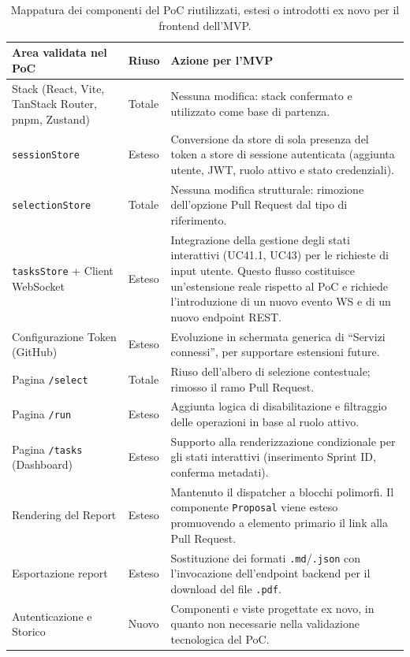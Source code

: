 \documentclass[11pt,a4paper]{article}
\begin{document}
\begin{table}[H]
\centering
\caption{Mappatura dei componenti del PoC riutilizzati, estesi o introdotti ex novo per il frontend dell'MVP.}
\label{tab:fe-mappatura-componenti}
\vspace{2mm}
\renewcommand{\arraystretch}{1.2}
\begin{tabularx}{\textwidth}{|X|l|X|}
\hline
\textbf{Area validata nel PoC} & \textbf{Riuso} & \textbf{Azione per l'MVP} \\ \hline
Stack (React, Vite, TanStack Router, pnpm, Zustand) & Totale & Nessuna modifica: stack confermato e utilizzato come base di partenza. \\ \hline
\texttt{sessionStore} & Esteso & Conversione da store di sola presenza del token a store di sessione autenticata (aggiunta utente, JWT, ruolo attivo e stato credenziali). \\ \hline
\texttt{selectionStore} & Totale & Nessuna modifica strutturale: rimozione dell'opzione Pull Request dal tipo di riferimento. \\ \hline
\texttt{tasksStore} + Client WebSocket & Esteso & Integrazione della gestione degli stati interattivi (UC41.1, UC43) per le richieste di input utente. Questo flusso costituisce un'estensione reale rispetto al PoC e richiede l'introduzione di un nuovo evento WS e di un nuovo endpoint REST. \\ \hline
Configurazione Token (GitHub) & Esteso & Evoluzione in schermata generica di ``Servizi connessi'', per supportare estensioni future. \\ \hline
Pagina \texttt{/select} & Totale & Riuso dell'albero di selezione contestuale; rimosso il ramo Pull Request. \\ \hline
Pagina \texttt{/run} & Esteso & Aggiunta logica di disabilitazione e filtraggio delle operazioni in base al ruolo attivo. \\ \hline
Pagina \texttt{/tasks} (Dashboard) & Esteso & Supporto alla renderizzazione condizionale per gli stati interattivi (inserimento Sprint ID, conferma metadati). \\ \hline
Rendering del Report & Esteso & Mantenuto il dispatcher a blocchi polimorfi. Il componente \texttt{Proposal} viene esteso promuovendo a elemento primario il link alla Pull Request. \\ \hline
Esportazione report & Esteso & Sostituzione dei formati \texttt{.md}/\texttt{.json} con l'invocazione dell'endpoint backend per il download del file \texttt{.pdf}. \\ \hline
Autenticazione e Storico & Nuovo & Componenti e viste progettate ex novo, in quanto non necessarie nella validazione tecnologica del PoC. \\ \hline
\end{tabularx}
\end{table}
\end{document}
